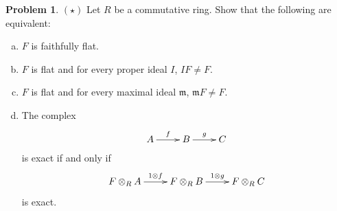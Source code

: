 \documentclass[11pt]{article}
\newcommand{\m}{\mathfrak{m}}
\theoremstyle{definition}
\newtheorem{problem}{Problem}
\begin{document}
\vspace{2em}

\noindent
{} 

\vspace{0.5em}

\begin{problem} 
$(\star)$ Let $R$ be a commutative ring.
Show that the following are equivalent:	
\begin{enumerate}[a)]
		\item $F$ is faithfully flat.
		\item $F$ is flat and for every proper ideal $I$, $IF \neq F$.
		\item $F$ is flat and for every maximal ideal $\m$, $\m F \neq F$.
		\item The complex
		$$\xymatrix{A \ar[r]^-f & B \ar[r]^-g & C}$$
		is exact if and only if 
		$$\xymatrix{F \otimes_R A \ar[r]^-{1 \otimes f} & F \otimes_R B \ar[r]^-{1 \otimes g} & F \otimes_R C}$$ 
		is exact.
	\end{enumerate}
\end{problem}
\end{document}
